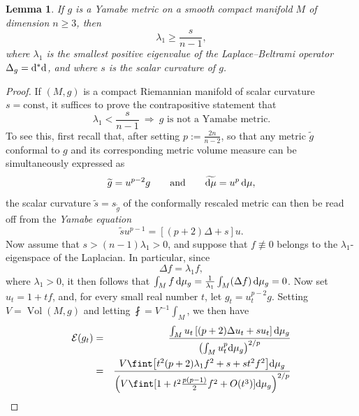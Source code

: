 \documentclass[10pt,a4paper]{amsart}
\numberwithin{equation}{section}
\newtheorem{Lemma}[Theorem]{Lemma}
\DeclareMathOperator{\Vol}{Vol}
\begin{document}
\begin{Lemma}\label{symptom}
If $g$ is a Yamabe metric on a smooth compact manifold $M$ of dimension $n\geq 3$, then
\begin{equation}\label{eigen}
\lambda_1 \geq \frac{s}{n-1},
\end{equation}
where $\lambda_1$ is the smallest positive eigenvalue of the Laplace--Beltrami operator $\Delta_{g} = {\rm d}^*{\rm d}$,
and where $s$ is the scalar curvature of $g$.
\end{Lemma}
\begin{proof}
If $(M,g)$ is a compact Riemannian manifold of scalar curvature $s=\text{const}$, it suffices to prove the contrapositive statement that
\begin{equation*}
\lambda_1 < \frac{s}{n-1} \ \Longrightarrow \ \mbox{$g$ is not a Yamabe metric.}
\end{equation*}
To see this, first recall that, after setting $p:=\frac{2n}{n-2}$, so that
any metric $\widetilde{g}$ conformal to $g$ and its corresponding metric volume measure can be simultaneously expressed as
\begin{equation*}
\widetilde{g}= u^{p-2}g \qquad \mbox{and} \qquad \widetilde{{\rm d}\mu} = u^p \,{\rm d}\mu,
\end{equation*}
the scalar curvature $\widetilde{s} = s_{\tilde{g}}$ of the conformally rescaled metric can then be read off from the
{\em Yamabe equation}
\begin{equation}
\label{yammer}
\widetilde{s} u^{p-1} = \left[(p+2) \Delta + s\right] u.
\end{equation}
Now
assume that $s > (n-1) \lambda_1 > 0$, and suppose that $f\not\equiv 0$ belongs to the $\lambda_1$-eigenspace of the Laplacian. In particular, since
\begin{equation*}
\Delta f = \lambda_1 f,
\end{equation*}
where $\lambda_1 > 0$, it then follows that $\int_M f\,{\rm d}\mu_g=\frac{1}{\lambda_1}\int_M (\Delta f)\,{\rm d}\mu_g=0$.
Now set $u_t = 1 + t f$, and, for every small real number $t$, let $g_t = u_t^{p-2}g$.
Setting $V= \Vol (M,g)$ and letting $\fint = {V}^{-1} \int_M$, we then have
\begin{eqnarray*}
\mathcal{E}(g_t)&=&\frac{\int_M u_t \left[ (p+2)\Delta u_t + s u_t\right] {\rm d}\mu_g}{\left(\int_M u_{t}^p{\rm d}\mu_g\right)^{2/p}} \\
&=&\frac{V\fint \big[ t^2 (p+2)\lambda_1f^2 + s+ s t^2 f^2 \big] {\rm d}\mu_g}{\left(V\fint [1+t^2 \frac{p(p-1)}{2} f^2 +O(t^3)] {\rm d}\mu_g\right)^{2/p}} \\

\end{eqnarray*}
\end{proof}
\end{document}
